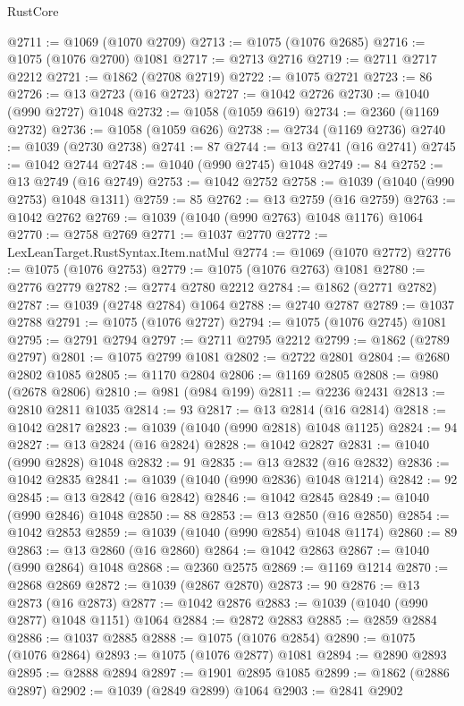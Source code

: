 \begin{lexlean}{RustCore}
\begin{coremodule}
@2711 := @1069 (@1070 @2709)
@2713 := @1075 (@1076 @2685)
@2716 := @1075 (@1076 @2700) @1081
@2717 := @2713 @2716
@2719 := @2711 @2717 @2212
@2721 := @1862 (@2708 @2719)
@2722 := @1075 @2721
@2723 := 86
@2726 := @13 @2723 (@16 @2723)
@2727 := @1042 @2726
@2730 := @1040 (@990 @2727) @1048
@2732 := @1058 (@1059 @619)
@2734 := @2360 (@1169 @2732)
@2736 := @1058 (@1059 @626)
@2738 := @2734 (@1169 @2736)
@2740 := @1039 (@2730 @2738)
@2741 := 87
@2744 := @13 @2741 (@16 @2741)
@2745 := @1042 @2744
@2748 := @1040 (@990 @2745) @1048
@2749 := 84
@2752 := @13 @2749 (@16 @2749)
@2753 := @1042 @2752
@2758 := @1039 (@1040 (@990 @2753) @1048 @1311)
@2759 := 85
@2762 := @13 @2759 (@16 @2759)
@2763 := @1042 @2762
@2769 := @1039 (@1040 (@990 @2763) @1048 @1176) @1064
@2770 := @2758 @2769
@2771 := @1037 @2770
@2772 := LexLeanTarget.RustSyntax.Item.natMul
@2774 := @1069 (@1070 @2772)
@2776 := @1075 (@1076 @2753)
@2779 := @1075 (@1076 @2763) @1081
@2780 := @2776 @2779
@2782 := @2774 @2780 @2212
@2784 := @1862 (@2771 @2782)
@2787 := @1039 (@2748 @2784) @1064
@2788 := @2740 @2787
@2789 := @1037 @2788
@2791 := @1075 (@1076 @2727)
@2794 := @1075 (@1076 @2745) @1081
@2795 := @2791 @2794
@2797 := @2711 @2795 @2212
@2799 := @1862 (@2789 @2797)
@2801 := @1075 @2799 @1081
@2802 := @2722 @2801
@2804 := @2680 @2802 @1085
@2805 := @1170 @2804
@2806 := @1169 @2805
@2808 := @980 (@2678 @2806)
@2810 := @981 (@984 @199)
@2811 := @2236 @2431
@2813 := @2810 @2811 @1035
@2814 := 93
@2817 := @13 @2814 (@16 @2814)
@2818 := @1042 @2817
@2823 := @1039 (@1040 (@990 @2818) @1048 @1125)
@2824 := 94
@2827 := @13 @2824 (@16 @2824)
@2828 := @1042 @2827
@2831 := @1040 (@990 @2828) @1048
@2832 := 91
@2835 := @13 @2832 (@16 @2832)
@2836 := @1042 @2835
@2841 := @1039 (@1040 (@990 @2836) @1048 @1214)
@2842 := 92
@2845 := @13 @2842 (@16 @2842)
@2846 := @1042 @2845
@2849 := @1040 (@990 @2846) @1048
@2850 := 88
@2853 := @13 @2850 (@16 @2850)
@2854 := @1042 @2853
@2859 := @1039 (@1040 (@990 @2854) @1048 @1174)
@2860 := 89
@2863 := @13 @2860 (@16 @2860)
@2864 := @1042 @2863
@2867 := @1040 (@990 @2864) @1048
@2868 := @2360 @2575
@2869 := @1169 @1214
@2870 := @2868 @2869
@2872 := @1039 (@2867 @2870)
@2873 := 90
@2876 := @13 @2873 (@16 @2873)
@2877 := @1042 @2876
@2883 := @1039 (@1040 (@990 @2877) @1048 @1151) @1064
@2884 := @2872 @2883
@2885 := @2859 @2884
@2886 := @1037 @2885
@2888 := @1075 (@1076 @2854)
@2890 := @1075 (@1076 @2864)
@2893 := @1075 (@1076 @2877) @1081
@2894 := @2890 @2893
@2895 := @2888 @2894
@2897 := @1901 @2895 @1085
@2899 := @1862 (@2886 @2897)
@2902 := @1039 (@2849 @2899) @1064
@2903 := @2841 @2902

\end{coremodule}
\end{lexlean}
